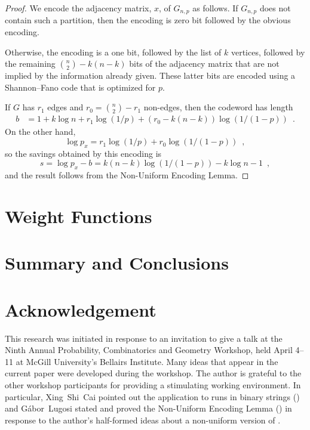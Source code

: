 \documentclass{patmorin}
\begin{document}
\begin{proof}
  We encode the adjacency matrix, $x$, of $G_{n,p}$ as follows.
  If $G_{n,p}$ does not contain such a partition, then the encoding is
  zero bit followed by the obvious encoding.

  Otherwise, the encoding is a one bit, followed by the list of $k$
  vertices, followed by the remaining $\binom{n}{2}-k(n-k)$ bits of the
  adjacency matrix that are not implied by the information already given.
  These latter bits are encoded using a Shannon--Fano code that is
  optimized for $p$.

  If $G$ has $r_1$ edges and $r_0=\binom{n}{2}-r_1$ non-edges, then the codeword has length
  \begin{align*}
      b & = 1 + k\log n + r_1\log(1/p) + (r_0-k(n-k))\log(1/(1-p)) \enspace .
  \end{align*}
  On the other hand,
  \[
      \log p_x = r_1\log(1/p) + r_0\log(1/(1-p)) \enspace ,
  \]
  so the savings obtained by this encoding is 
  \[
      s = \log p_x - b = k(n-k)\log(1/(1-p)) - k\log n - 1 \enspace ,
  \]
  and the result follows from the Non-Uniform Encoding Lemma.
\end{proof}




\subsection{}


\section{Weight Functions}

\section{Summary and Conclusions}


\section*{Acknowledgement}

This research was initiated in response to an invitation to give
a talk at the Ninth Annual Probability, Combinatorics and Geometry
Workshop, held April 4--11 at McGill University's Bellairs Institute.
Many ideas that appear in the current paper were developed during the
workshop. The author is grateful to the other workshop participants for
providing a stimulating working environment.  In particular, Xing~Shi~Cai
pointed out the application to runs in binary strings ()
and G\'abor~Lugosi stated and proved the Non-Uniform Encoding Lemma
() in response to the author's half-formed ideas about a
non-uniform version of .



\end{document}

